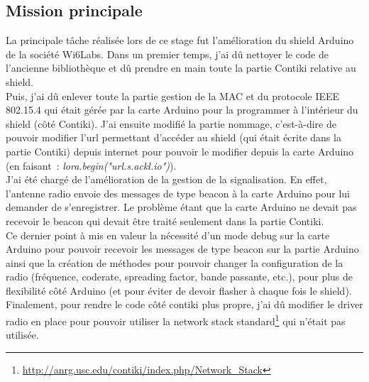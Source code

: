 \documentclass{article}
\begin{document}
\subsection{Mission principale}
La principale tâche réalisée lors de ce stage fut l'amélioration du shield Arduino de la société Wi6Labs. 
Dans un premier temps, j'ai dû nettoyer le code de l'ancienne bibliothèque et dû prendre en main toute la partie Contiki relative au shield.\\
Puis, j'ai dû enlever toute la partie gestion de la MAC et du protocole IEEE 802.15.4 qui était gérée par la carte Arduino pour la programmer à l'intérieur du shield (côté Contiki). J'ai ensuite modifié la partie nommage, c'est-à-dire de pouvoir modifier l'url permettant d'accéder au shield (qui était écrite dans la partie Contiki) depuis internet pour pouvoir le modifier depuis la carte Arduino (en faisant~: \emph{lora.begin("url.s.ackl.io")}).\\
J'ai été chargé de l'amélioration de la gestion de la signalisation. En effet, l'antenne radio envoie des messages de type beacon à la carte Arduino pour lui demander de s'enregistrer. Le problème étant que la carte Arduino ne devait pas recevoir le beacon qui devait être traité seulement dans la partie Contiki.\\
Ce dernier point à mis en valeur la nécessité d'un mode debug sur la carte Arduino pour pouvoir recevoir les messages de type beacon sur la partie Arduino ainsi que la création de méthodes pour pouvoir changer la configuration de la radio (fréquence, coderate, spreading factor, bande passante, etc.), pour plus de flexibilité côté Arduino (et pour éviter de devoir flasher à chaque fois le shield).\\
Finalement, pour rendre le code côté contiki plus propre, j'ai dû modifier le driver radio en place pour pouvoir utiliser la network stack standard\footnote{\url{http://anrg.usc.edu/contiki/index.php/Network_Stack}} qui n'était pas utilisée.\\
\end{document}
